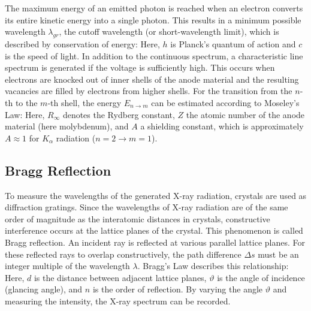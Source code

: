 The maximum energy of an emitted photon is reached when an electron converts its entire kinetic energy into a single photon. This results in a minimum possible wavelength $\lambda_{gr}$, the cutoff wavelength (or short-wavelength limit), which is described by conservation of energy:
Here, $h$ is Planck's quantum of action and $c$ is the speed of light. In addition to the continuous spectrum, a characteristic line spectrum is generated if the voltage is sufficiently high. This occurs when electrons are knocked out of inner shells of the anode material and the resulting vacancies are filled by electrons from higher shells. For the transition from the $n$-th to the $m$-th shell, the energy $E_{n \to m}$ can be estimated according to Moseley's Law:
Here, $R_\infty$ denotes the Rydberg constant, $Z$ the atomic number of the anode material (here molybdenum), and $A$ a shielding constant, which is approximately $A \approx 1$ for $K_\alpha$ radiation ($n=2 \to m=1$).

\subsection{Bragg Reflection}
To measure the wavelengths of the generated X-ray radiation, crystals are used as diffraction gratings. Since the wavelengths of X-ray radiation are of the same order of magnitude as the interatomic distances in crystals, constructive interference occurs at the lattice planes of the crystal. This phenomenon is called Bragg reflection. An incident ray is reflected at various parallel lattice planes. For these reflected rays to overlap constructively, the path difference $\Delta s$ must be an integer multiple of the wavelength $\lambda$. Bragg's Law describes this relationship:
Here, $d$ is the distance between adjacent lattice planes, $\vartheta$ is the angle of incidence (glancing angle), and $n$ is the order of reflection. By varying the angle $\vartheta$ and measuring the intensity, the X-ray spectrum can be recorded.


